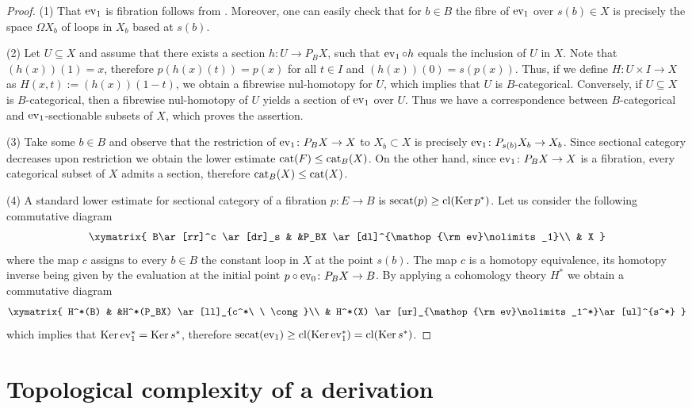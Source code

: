 \documentclass[11pt]{amsart}
\theoremstyle{plain}
\theoremstyle{definition}
\newcommand{\Ker}{\mathop{\rm Ker}\nolimits}
\newcommand{\cl}{\mathop{\rm cl}\nolimits}
\newcommand{\ev}{\mathop{\rm ev}\nolimits}
\newcommand{\cat}{\mathop{\rm cat}\nolimits}
\newcommand{\secat}{\mathop{\rm secat}\nolimits}
\begin{document}
\begin{proof}
(1) That $\ev_1$ is fibration follows from \cite[Appendix]{CohenFarberWeinberger2022}. 
Moreover, one can easily check that for $b\in B$ the fibre of $\ev_1$ over $s(b)\in X$ 
is precisely the space $\Omega X_b$ of loops in $X_b$ based at $s(b)$.

(2) Let $U\subseteq X$ and assume that there exists a section $h\colon U\to P_BX$, such that 
$\ev_1\circ h$ equals the inclusion of $U$ in $X$. Note that $(h(x))(1)=x$, therefore 
$p(h(x)(t))=p(x)$ for all $t\in I$ and $(h(x))(0)=s(p(x))$. Thus, if we define $H\colon U\times I\to X$ 
as $H(x,t):=(h(x))(1-t)$, we obtain a fibrewise nul-homotopy for $U$, which implies that $U$ is 
$B$-categorical. Conversely, if $U\subseteq X$ is $B$-categorical, then a fibrewise nul-homotopy of $U$
yields a section of $\ev_1$ over $U$. Thus we have a correspondence between $B$-categorical and 
$\ev_1$-sectionable subsets of $X$, which proves the assertion.

(3) Take some $b\in B$ and observe that the restriction of  $\ev_1\colon P_BX\to X$ to $X_b\subset X$ 
is precisely $\ev_1\colon P_{s(b)}X_b\to X_b$. Since sectional category decreases upon restriction 
we obtain the lower estimate $\cat(F)\le\cat_B(X)$. On the other hand, since 
$\ev_1\colon P_BX\to X$ is a fibration,  every categorical subset of $X$ admits a section, therefore 
$\cat_B(X)\le \cat(X)$.

(4) A standard lower estimate for sectional category of a fibration $p\colon E\to B$ is 
$\secat(p)\ge \cl(\Ker p^*)$. Let us consider the following commutative diagram
$$\xymatrix{
B\ar[rr]^c \ar[dr]_s & &P_BX \ar[dl]^{\ev_1}\\
& X
}$$
where the map $c$ assigns to every $b\in B$ the constant loop in $X$ at the point $s(b)$. 
The map $c$ is a homotopy equivalence, its homotopy inverse being given by the 
evaluation at the initial point $p\circ \ev_0\colon P_BX\to B$. By applying a cohomology
theory $H^*$ we obtain a commutative diagram
$$\xymatrix{
H^*(B)  & &H^*(P_BX) \ar[ll]_{c^*\ \ \cong}\\
& H^*(X) \ar[ur]_{\ev_1^*}\ar[ul]^{s^*}
}$$
which implies that $\Ker \ev_1^*=\Ker s^*$, therefore $\secat(\ev_1)\ge \cl(\Ker\ev_1^*)=\cl(\Ker s^*)$.
\end{proof}


 

\section{Topological complexity of a derivation}\label{sec:Topological complexity of a derivation}
\end{document}
